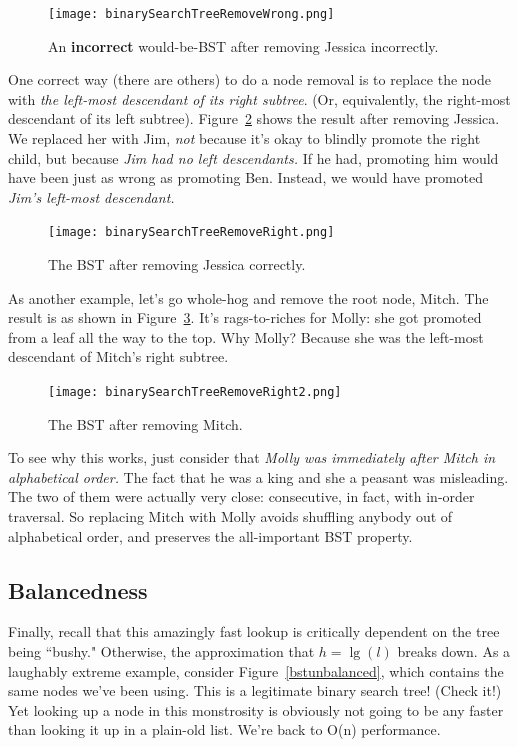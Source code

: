 \begin{figure}[ht]
\centering
\texttt{[image: binarySearchTreeRemoveWrong.png]}
\caption{An \textbf{incorrect} would-be-BST after removing Jessica
incorrectly.}
\label{bstremovewrong}
\end{figure}

One correct way (there are others) to do a node removal is to replace the
node with \textit{the left-most descendant of its right subtree}. (Or,
equivalently, the right-most descendant of its left subtree).
Figure~\ref{bstremoveright} shows the result after removing Jessica. We
replaced her with Jim, \textit{not} because it's okay to blindly promote
the right child, but because \textit{Jim had no left descendants.} If he
had, promoting him would have been just as wrong as promoting Ben. Instead,
we would have promoted \textit{Jim's left-most descendant.}

\begin{figure}[ht]
\centering
\texttt{[image: binarySearchTreeRemoveRight.png]}
\caption{The BST after removing Jessica correctly.}
\label{bstremoveright}
\end{figure}

As another example, let's go whole-hog and remove the root node, Mitch. The
result is as shown in Figure~\ref{bstremoveright2}. It's rags-to-riches for
Molly: she got promoted from a leaf all the way to the top. Why Molly?
Because she was the left-most descendant of Mitch's right subtree.

\begin{figure}[ht]
\centering
\texttt{[image: binarySearchTreeRemoveRight2.png]}
\caption{The BST after removing Mitch.}
\label{bstremoveright2}
\end{figure}

To see why this works, just consider that \textit{Molly was immediately
after Mitch in alphabetical order.} The fact that he was a king and she a
peasant was misleading. The two of them were actually very close:
consecutive, in fact, with in-order traversal. So replacing Mitch with
Molly avoids shuffling anybody out of alphabetical order, and preserves the
all-important BST property.

\subsection{Balancedness}

Finally, recall that this amazingly fast lookup is critically dependent on
the tree being ``bushy." Otherwise, the approximation that $h=\lg(l)$
breaks down. As a laughably extreme example, consider
Figure~\ref{bstunbalanced}, which contains the same nodes we've been using.
This is a legitimate binary search tree! (Check it!) Yet looking up a node
in this monstrosity is obviously not going to be any faster than looking it
up in a plain-old list. We're back to O(n) performance.

